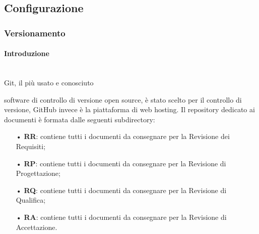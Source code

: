 \subsection{Configurazione}
\subsubsection{Versionamento}

\paragraph{Introduzione}\mbox{}\\
Git, il più usato e conosciuto {software di controllo di {versione} open source, è stato scelto per il controllo di versione, GitHub invece è la piattaforma di web hosting. 
\newline
Il repository dedicato ai documenti è formata dalle seguenti subdirectory:
\begin{itemize}
\item[•] \textbf{RR}: contiene tutti i documenti da consegnare per la Revisione dei Requisiti;
\item[•] \textbf{RP}: contiene tutti i documenti da consegnare per la Revisione di Progettazione;
\item[•] \textbf{RQ}: contiene tutti i documenti da consegnare per la Revisione di Qualifica;
\item[•] \textbf{RA}: contiene tutti i documenti da consegnare per la Revisione di Accettazione.
\end{itemize}


}
